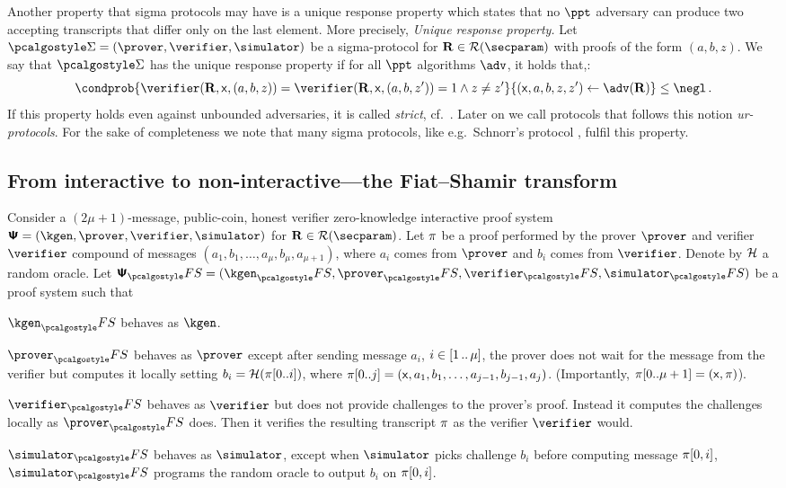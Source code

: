\documentclass[runningheads,11pt]{llncs}
\newcommand{\ourpar}[1] {\smallskip\noindent\emph{#1}}
\begin{document}
Another property that sigma protocols may have is a unique response
property \cite{C:Fischlin05} which states that no $\ppt$ adversary can
produce two accepting transcripts that differ only on the last
element. More precisely, 
\ourpar{Unique response property.} Let
$\sigmaprot = (\prover, \verifier, \simulator)$ be a sigma-protocol for
$\REL \in \RELGEN(\secparam)$ with proofs of the form
$(a, b, z)$. We say that $\sigmaprot$ has the unique response property if for
all $\ppt$ algorithms $\adv$, it holds that,:
\[ \condprob{\verifier (\REL, \inp, (a, b, z)) = \verifier (\REL, \inp, (a, b,
	z')) = 1 \land z \neq z'}{(\inp, a, b, z, z') \gets \adv(\REL)} \leq \negl\,.  \]
If this property holds even against unbounded adversaries, it is called
\emph{strict}, cf.~\cite{INDOCRYPT:FKMV12}. Later on we call protocols that
follows this notion \emph{ur-protocols}. For the sake of completeness we note
that many sigma protocols, like e.g.~Schnorr's protocol \cite{C:Schnorr89},
fulfil this property.

\subsection{From interactive to non-interactive---the Fiat--Shamir transform}
Consider a $(2\mu + 1)$-message, public-coin, honest verifier zero-knowledge
interactive proof system
$\proofsystem = (\kgen, \prover, \verifier, \simulator)$ for
$\REL \in \RELGEN(\secparam)$.  Let $\pi$ be a proof performed by the
prover $\prover$ and verifier $\verifier$ compound of messages
$(a_1, b_1, \ldots, a_{\mu}, b_{\mu}, a_{\mu + 1})$, where $a_i$ comes from
$\prover$ and $b_i$ comes from $\verifier$.  Denote by $\mathcal{H}$ a random oracle.
Let $\proofsystem_\fs = (\kgen_\fs, \prover_\fs, \verifier_\fs, \simulator_\fs)$
be a proof system such that
\begin{compactitem}
  \item $\kgen_\fs$ behaves as $\kgen$.
  \item $\prover_\fs$ behaves as $\prover$ except after sending message
    $a_i$, $i \in [1 \, .. \, \mu]$, the prover does not wait for
    the message from the verifier but computes it locally setting $b_i
    = \mathcal{H}(\pi[0..i])$, where $\pi[0..j] = (\mathsf{x}, a_1, b_1, \ldots,
    a_{j - 1}, b_{j - 1}, a_j)$. (Importantly, $\pi[0..\mu + 1] =
    (\mathsf{x}, \pi)$).
  \item $\verifier_\fs$ behaves as $\verifier$ but does not provide
    challenges to the prover's proof. Instead it computes the
    challenges locally as $\prover_\fs$ does. Then it verifies the
    resulting transcript $\pi$ as the verifier $\verifier$ would. 
  \item $\simulator_\fs$ behaves as $\simulator$, except when
    $\simulator$ picks challenge $b_i$ before computing message $\pi[0, i]$, $\simulator_\fs$ programs the
    random oracle to output $b_i$ on $\pi[0, i]$.
  \end{compactitem}
\end{document}
